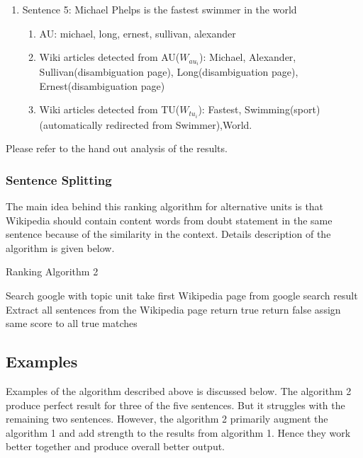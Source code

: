 \documentclass[11pt]{article}
\begin{document}
\begin{enumerate}
\begin{enumerate}
\end{enumerate}


\item Sentence 5: Michael Phelps is the fastest swimmer in the world
\begin{enumerate}
\item AU: michael, long, ernest, sullivan, alexander
\item Wiki articles detected from AU($W_{au_{i}}$): Michael, Alexander, Sullivan(disambiguation page), Long(disambiguation page), Ernest(disambiguation page) 
\item Wiki articles detected from TU($W_{tu_{i}}$): Fastest, Swimming(sport) (automatically redirected from Swimmer),World.

\end{enumerate}


\end{enumerate}

Please refer to the hand out analysis of the results.


\subsubsection{Sentence Splitting}

The main idea behind this ranking algorithm for alternative units is that Wikipedia should contain content words from doubt statement in the same sentence because of the similarity in the context. Details description of the algorithm is given below.


\begin{algorithm}
\small
\caption{Ranking Algorithm 2}
\label{alg:AssignScore} 
\begin{algorithmic}
\STATE Search google with topic unit
\STATE take first Wikipedia page from google search result
\STATE Extract all sentences from the Wikipedia page
				\STATE return true
			\ELSE
				\STATE return false	
			\ENDIF
		\ENDIF
	\ENDFOR
\ENDFOR		
\STATE assign same score to all true matches

\end{algorithmic}
\end{algorithm}

\subsection{Examples}
Examples of the algorithm described above is discussed below. The algorithm 2 produce perfect result for three of the five sentences. But it struggles with the remaining two sentences. However, the algorithm 2 primarily augment the algorithm 1 and add strength to the results from algorithm 1. Hence they work better together and produce overall better output.
\end{document}
